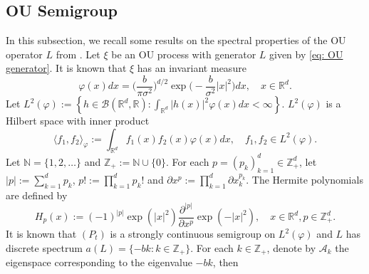 \documentclass[12pt,a4paper]{amsart}
\theoremstyle{plain}
\theoremstyle{definition}
\numberwithin{equation}{section}
\begin{document}


\subsection{OU Semigroup}
    In this subsection, we recall some results on the spectral properties of the OU operator $L$ from \cite{GD}.
    Let $\xi$ be an OU process with generator $L$ given by \eqref{eq: OU generator}.
    It is known that $\xi$ has an invariant measure
\begin{equation}
\label{invariantdensity}
    \varphi(x)dx
    =\Big (\frac{b}{\pi \sigma^2}\Big )^{d/2}\exp \Big(-\frac{b}{\sigma^2}|x|^2 \Big)dx,
    \quad x\in \mathbb R^d.
\end{equation}
    Let $L^2(\varphi):= \left\{ h  \in \mathcal B(\mathbb R^d, \mathbb R): \int_{\mathbb R^d} |h(x)|^2 \varphi(x) dx < \infty \right\}$. $L^2(\varphi)$ is a Hilbert space with inner product
\begin{equation}
    \langle f_1, f_2 \rangle_{\varphi}
    := \int_{\mathbb R^d}f_1(x)f_2(x)\varphi(x) dx, \quad f_1,f_2 \in L^2(\varphi).
\end{equation}
     Let $\mathbb N = \{1,2,\dots\}$ and $\mathbb Z_+ := \mathbb N\cup\{0\}$.
     For each $p = (p_k)_{k = 1}^d \in \mathbb{Z}_+^{d}$,
    let $|p|:=\sum_{k=1}^d p_k$, $p!:= \prod_{k= 1}^d p_k !$ and $\partial x^p:= \prod_{k = 1}^d\partial x_k^{p_k}$.
    The Hermite polynomials are defined by
\begin{equation}
    H_p(x)
    :=(-1)^{|p|}\exp(|x|^2) \frac{\partial ^{|p|}}{\partial x^p} \exp(-|x|^2) ,
    \quad x\in \mathbb R^d,
    p \in \mathbb{Z}_+^{d}.
\end{equation}
    It is known that $(P_t)$ is a strongly continuous semigroup on $L^2(\varphi)$ and $L$ has
    discrete spectrum $a(L)= \{-bk: k \in \mathbb Z_+\}$.
    For each $k \in \mathbb Z_+$, denote by $\mathcal{A}_k$ the eigenspace corresponding to the eigenvalue $-bk$, then
\end{document}
